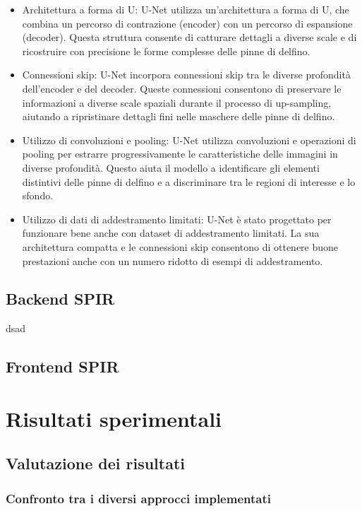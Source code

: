 \documentclass[a4paper,12pt]{report}
\begin{document}
      \begin{itemize}
        \item Architettura a forma di U: U-Net utilizza un'architettura a forma di U, che combina un percorso di contrazione (encoder) con un percorso di espansione (decoder). Questa struttura consente di catturare dettagli a diverse scale e di ricostruire con precisione le forme complesse delle pinne di delfino.
        \item Connessioni skip: U-Net incorpora connessioni skip tra le diverse profondità dell'encoder e del decoder. Queste connessioni consentono di preservare le informazioni a diverse scale spaziali durante il processo di up-sampling, aiutando a ripristinare dettagli fini nelle maschere delle pinne di delfino.
        \item Utilizzo di convoluzioni e pooling: U-Net utilizza convoluzioni e operazioni di pooling per estrarre progressivamente le caratteristiche delle immagini in diverse profondità. Questo aiuta il modello a identificare gli elementi distintivi delle pinne di delfino e a discriminare tra le regioni di interesse e lo sfondo.
        \item Utilizzo di dati di addestramento limitati: U-Net è stato progettato per funzionare bene anche con dataset di addestramento limitati. La sua architettura compatta e le connessioni skip consentono di ottenere buone prestazioni anche con un numero ridotto di esempi di addestramento.
      \end{itemize}

    \section{Backend SPIR}
    dsad
    \section{Frontend SPIR}

\chapter{Risultati sperimentali}
  \section{Valutazione dei risultati}
    \subsection{Confronto tra i diversi approcci implementati}
\end{document}
